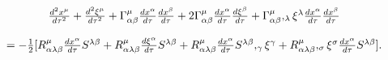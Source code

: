 \begin{equation}
\begin{array}{c}
\frac{d^{2}x^{\mu }}{d\tau ^{2}}+\frac{d^{2}\xi ^{\mu }}{d\tau ^{2}}+\Gamma
_{\alpha \beta }^{\mu }\frac{dx^{\alpha }}{d\tau }\frac{dx^{\beta }}{d\tau }%
+2\Gamma _{\alpha \beta }^{\mu }\frac{dx^{\alpha }}{d\tau }\frac{d\xi
^{\beta }}{d\tau }+\Gamma _{\alpha \beta }^{\mu },_{\lambda }\xi ^{\lambda }%
\frac{dx^{\alpha }}{d\tau }\frac{dx^{\beta }}{d\tau } \\ 
\\ 
=-\frac{1}{2}[R_{\alpha \lambda \beta }^{\mu }\frac{dx^{\alpha }}{d\tau }%
S^{\lambda \beta }+R_{\alpha \lambda \beta }^{\mu }\frac{d\xi ^{\alpha }}{%
d\tau }S^{\lambda \beta }+R_{\alpha \lambda \beta }^{\mu }\frac{dx^{\alpha }%
}{d\tau }S^{\lambda \beta },_{\gamma }\xi ^{\gamma }+R_{\alpha \lambda \beta
}^{\mu },_{\sigma }\xi ^{\sigma }\frac{dx^{\alpha }}{d\tau }S^{\lambda \beta
}].
\end{array}
\label{20}
\end{equation}

